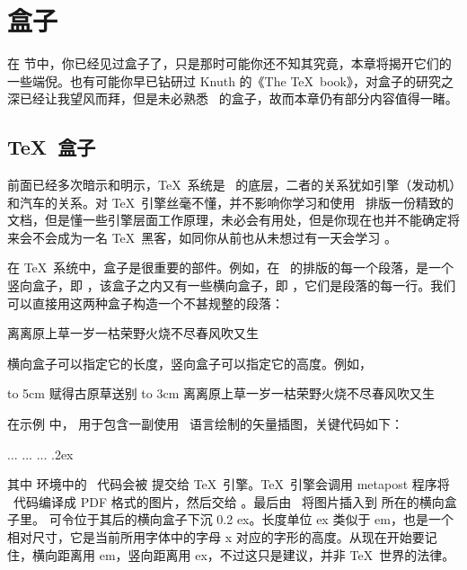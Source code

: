 \chapter{盒子}

在  节中，你已经见过盒子了，只是那时可能你还不知其究竟，本章将揭开它们的一些端倪。也有可能你早已钻研过 Knuth 的《The \TeX\ book》，对盒子的研究之深已经让我望风而拜，但是未必熟悉 \ConTeXt\ 的盒子，故而本章仍有部分内容值得一睹。

\section{\TeX\ 盒子}

前面已经多次暗示和明示，\TeX\ 系统是 \ConTeXt\ 的底层，二者的关系犹如引擎（发动机）和汽车的关系。对 \TeX\ 引擎丝毫不懂，并不影响你学习和使用 \ConTeXt\ 排版一份精致的文档，但是懂一些引擎层面工作原理，未必会有用处，但是你现在也并不能确定将来会不会成为一名 \TeX\ 黑客，如同你从前也从未想过有一天会学习 \ConTeXt。

在 \TeX\ 系统中，盒子是很重要的部件。例如，在 \ConTeXt\ 的排版的每一个段落，是一个竖向盒子，即 \type{\vbox}，该盒子之内又有一些横向盒子，即 \type{\hbox}，它们是段落的每一行。我们可以直接用这两种盒子构造一个不甚规整的段落：

\startsamplecode\startnarrowtyping
\vbox{
  \hbox{离离原上草}\hbox{一岁一枯荣}\hbox{野火烧不尽}\hbox{春风吹又生}
}
\stopnarrowtyping\stopsamplecode
{}

横向盒子可以指定它的长度，竖向盒子可以指定它的高度。例如，

\starttyping[option=TEX]
\hbox to 5cm {赋得古原草送别}
\vbox to 3cm {
  \hbox{离离原上草}\hbox{一岁一枯荣}\hbox{野火烧不尽}\hbox{春风吹又生}
}
\stoptyping

在示例 \in[rsquare] 中，\type{\hbox} 用于包含一副使用 \MetaPost\ 语言绘制的矢量插图，关键代码如下：

\starttyping[option=TEX]
... ... ...
\stopuseMPgraphic
\lower.2ex\hbox{}
\stoptyping

\noindent 其中  环境中的 \MetaPost\ 代码会被  提交给 \TeX\ 引擎。\TeX\ 引擎会调用 metapost 程序将 \MetaPost\ 代码编译成 PDF 格式的图片，然后交给 \ConTeXt。最后由 \ConTeXt\ 将图片插入到  所在的横向盒子里。\type{\lower .2ex} 可令位于其后的横向盒子下沉 0.2 ex。长度单位 ex 类似于 em，也是一个相对尺寸，它是当前所用字体中的字母 x 对应的字形的高度。从现在开始要记住，横向距离用 em，竖向距离用 ex，不过这只是建议，并非 \TeX\ 世界的法律。

